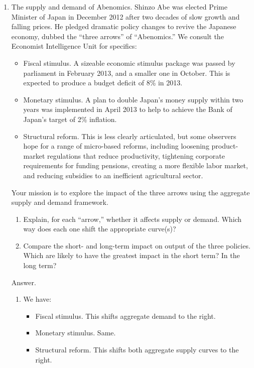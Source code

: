 \begin{enumerate}
\item The supply and demand of Abenomics.
Shinzo Abe was elected Prime Minister of Japan in December 2012
after two decades of slow growth and falling prices.
He pledged dramatic policy changes to revive the Japanese economy,
dubbed the ``three arrows'' of ``Abenomics.''
We consult the Economist Intelligence Unit for specifics:
%
\begin{itemize}
\item Fiscal stimulus.  A sizeable economic stimulus package was passed by parliament in
February 2013, and a smaller one in October.
This is expected to produce a budget deficit of 8\% in 2013.
\item Monetary stimulus. A plan to double Japan's
money supply within two years was implemented in April 2013 to help to achieve the Bank of Japan's
target of 2\%  inflation.
\item Structural reform.
This is less clearly articulated, but some observers hope for a range of micro-based reforms,
including loosening product-market regulations that reduce productivity,
tightening corporate requirements for funding pensions,
creating a more flexible labor market,
and reducing subsidies to an inefficient agricultural sector.
\end{itemize}
%
Your mission is to explore the impact of the three arrows using the aggregate supply and demand
framework.
\begin{enumerate}
\item Explain, for each ``arrow,'' whether it affects supply or demand.
Which way does each one shift the appropriate curve(s)?
\item Compare the short- and long-term impact on output of the three policies.
Which are likely to have the greatest impact in the short term?
In the long term?
\end{enumerate}

Answer. 
\begin{enumerate}
\item We have:
\begin{itemize}
\item Fiscal stimulus. This shifts aggregate demand to the right.
\item Monetary stimulus. Same.
\item Structural reform. This shifts both aggregate supply curves to the right.
\end{itemize}


\end{enumerate}
\end{enumerate}
